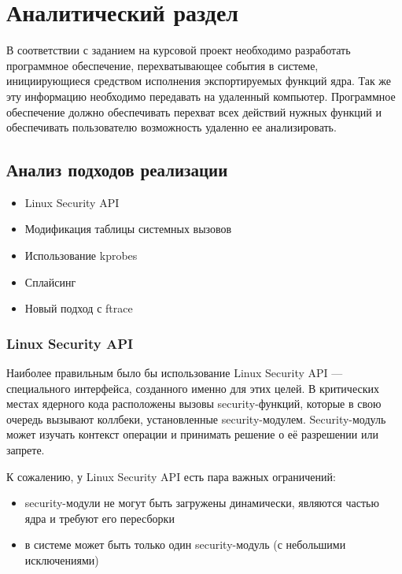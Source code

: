 \chapter{Аналитический раздел}
\label{cha:analysis}
%
%
В соответствии с заданием на курсовой проект необходимо разработать программное
обеспечение, перехватывающее события в системе, инициирующиеся средством исполнения экспортируемых функций ядра. Так же эту информацию необходимо передавать на удаленный компьютер.
Программное обеспечение должно обеспечивать перехват всех действий нужных функций и обеспечивать пользователю возможность удаленно ее анализировать.





\section{Анализ подходов реализации}

\begin{itemize}
	\item Linux Security API
	\item Модификация таблицы системных вызовов
	\item Использование kprobes
	\item Сплайсинг
	\item Новый подход с ftrace
	\end{itemize}

\subsection{Linux Security API}
Наиболее правильным было бы использование Linux Security API — специального интерфейса, созданного именно для этих целей. В критических местах ядерного кода расположены вызовы security-функций, которые в свою очередь вызывают коллбеки, установленные security-модулем. Security-модуль может изучать контекст операции и принимать решение о её разрешении или запрете.

К сожалению, у Linux Security API есть пара важных ограничений:
\begin{itemize}
	\item security-модули не могут быть загружены динамически, являются частью ядра и требуют его пересборки
	\item в системе может быть только один security-модуль (с небольшими исключениями)
\end{itemize}

